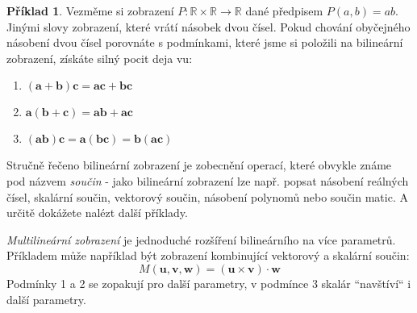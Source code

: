 \documentclass[a5paper,12pt]{amsbook}
\theoremstyle{definition}
\newtheorem{example}{Příklad}[chapter]
\newcommand{\myscalar}[1]{#1}
\newcommand{\myvec}[1]{\bm{#1}}
\newcommand{\myspace}[1]{\mathbb{#1}}
\newcommand{\mymap}[1]{#1}
\begin{document}
\begin{example}
Vezměme si zobrazení $\mymap{P}: \myspace{R}\times\myspace{R}\rightarrow\myspace{R}$ dané předpisem
$\mymap{P}(\myscalar{a}, \myscalar{b}) = \myscalar{a}\myscalar{b}$. Jinými slovy zobrazení, které vrátí
násobek dvou čísel. Pokud chování obyčejného násobení dvou čísel porovnáte s podmínkami, které jsme
si položili na bilineární zobrazení, získáte silný pocit deja vu:
\begin{enumerate}
  \item $(\myvec{a} + \myvec{b})\myvec{c} = \myvec{a}\myvec{c} + \myvec{b}\myvec{c}$
  \item $\myvec{a}(\myvec{b} + \myvec{c}) = \myvec{a}\myvec{b} + \myvec{a}\myvec{c}$
  \item $(\myvec{a}\myvec{b})\myvec{c} = \myvec{a}(\myvec{b}\myvec{c}) = \myvec{b}(\myvec{a}\myvec{c})$
\end{enumerate}
\end{example}

\noindent
Stručně řečeno bilineární zobrazení je zobecnění operací, které obvykle známe pod názvem \textit{součin} -
jako bilineární zobrazení lze např. popsat násobení reálných čísel, skalární součin, vektorový součin,
násobení polynomů nebo součin matic. A určitě dokážete nalézt další příklady.

\medskip\noindent
\textit{Multilineární zobrazení} je jednoduché rozšíření bilineárního na více parametrů. Příkladem může
například být zobrazení kombinující vektorový a skalární součin:
\begin{equation*}
\mymap{M}(\myvec{u}, \myvec{v}, \myvec{w}) = (\myvec{u}\times\myvec{v})\cdot\myvec{w}
\end{equation*}
Podmínky 1 a 2 se zopakují pro další parametry, v podmínce 3 skalár ``navštíví`` i další parametry.
\end{document}
